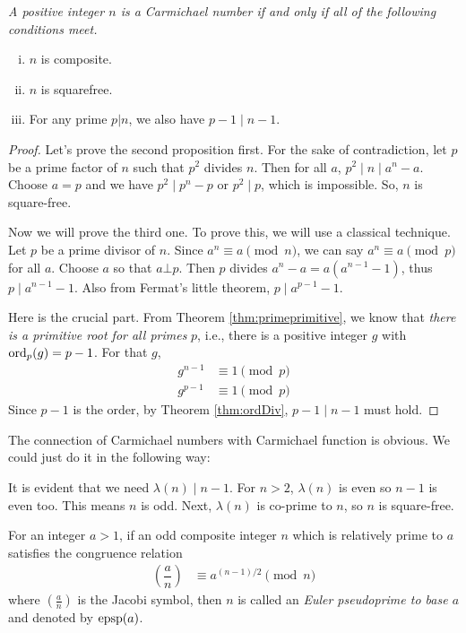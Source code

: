 \documentclass{subfile}
\begin{document}
	\begin{theorem}\slshape
		A positive integer $n$ is a Carmichael number if and only if all of the following conditions meet.
		\begin{enumerate}[i.]
			\item $n$ is composite.
			\item $n$ is squarefree.
			\item For any prime $p|n$, we also have $p-1 \mid n-1$.
		\end{enumerate}
	\end{theorem}

	\begin{proof}
		Let's prove the second proposition first. For the sake of contradiction, let $p$ be a prime factor of $n$ such that $p^2$ divides $n$. Then for all $a$, $p^2 \mid n \mid a^n-a$. Choose $a=p$ and we have $p^2 \mid p^n-p$ or $p^2 \mid p$, which is impossible. So, $n$ is square-free.

		Now we will prove the third one. To prove this, we will use a classical technique. Let $p$ be a prime divisor of $n$. Since $a^n\equiv a\pmod n$, we can say $a^n\equiv a\pmod p$ for all $a$. Choose $a$ so that $a\bot p$. Then $p$ divides $a^n-a=a(a^{n-1}-1)$, thus $p \mid a^{n-1}-1$. Also from Fermat's little theorem, $p \mid a^{p-1}-1$.

		Here is the crucial part. From Theorem \ref{thm:primeprimitive}, we know that \textit{there is a primitive root for all primes} $p$, i.e., there is a positive integer $g$ with $\operatorname{ord}_p(g)=p-1$. For that $g$,
		\begin{align*}
			g^{n-1}
				& \equiv1\pmod p\\
			g^{p-1}
				& \equiv1\pmod p
		\end{align*}
		Since $p-1$ is the order, by Theorem \ref{thm:ordDiv}, $p-1 \mid n-1$ must hold.
	\end{proof}

	\begin{note}
		The connection of Carmichael numbers with Carmichael function is obvious. We could just do it in the following way:

		It is evident that we need $\lambda(n)\mid n-1$. For $n>2$, $\lambda(n)$ is even so $n-1$ is even too. This means $n$ is odd. Next, $\lambda(n)$ is co-prime to $n$, so $n$ is square-free.
	\end{note}

	\begin{definition}\label{def:eulerpseudoprime}
		For an integer $a>1$, if an odd composite integer $n$ which is relatively prime to $a$ satisfies the congruence relation
			\begin{align*}
				\left(\dfrac{a}{n}\right)
					& \equiv a^{(n-1)/2} \pmod n
			\end{align*}
		where $\left(\frac{a}{n}\right)$ is the Jacobi symbol, then $n$ is called an \textit{Euler pseudoprime to base $a$} and denoted by $\operatorname{epsp}(a)$.
	\end{definition}
\end{document}

